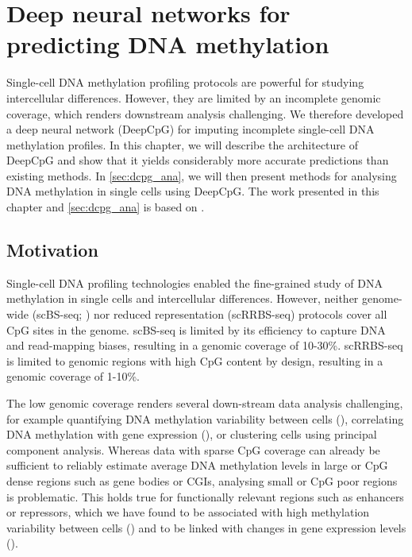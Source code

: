 \chapter{Deep neural networks for predicting DNA methylation} \label{sec:dcpg}

\ifpdf
    \graphicspath{{Chapter4/Figs/Raster/}{Chapter4/Figs/PDF/}{Chapter4/Figs/}}
\else
    \graphicspath{{Chapter4/Figs/Vector/}{Chapter4/Figs/}}
\fi

Single-cell DNA methylation profiling protocols are powerful for studying intercellular differences. However, they are limited by an incomplete genomic coverage, which renders downstream analysis challenging. We therefore developed a deep neural network (DeepCpG) for imputing incomplete single-cell DNA methylation profiles. In this chapter, we will describe the architecture of DeepCpG and show that it yields considerably more accurate predictions than existing methods. In \cref{sec:dcpg_ana}, we will then present methods for analysing DNA methylation in single cells using DeepCpG. The work presented in this chapter and \cref{sec:dcpg_ana} is based on \citet{angermueller_accurate_2017}.


\section{Motivation}

Single-cell DNA profiling technologies enabled the fine-grained study of DNA methylation in single cells and intercellular differences. However, neither genome-wide (scBS-seq; ) nor reduced representation (scRRBS-seq) protocols cover all CpG sites in the genome. scBS-seq is limited by its efficiency to capture DNA and read-mapping biases, resulting in a genomic coverage of 10-30\%. scRRBS-seq is limited to genomic regions with high CpG content by design, resulting in a genomic coverage of 1-10\%.

The low genomic coverage renders several down-stream data analysis challenging, for example quantifying DNA methylation variability between cells (), correlating DNA methylation with gene expression (), or clustering cells using principal component analysis. Whereas data with sparse CpG coverage can already be sufficient to reliably estimate average DNA methylation levels in large or CpG dense regions such as gene bodies or CGIs, analysing small or CpG poor regions is problematic. This holds true for functionally relevant regions such as enhancers or repressors, which we have found to be associated with high methylation variability between cells () and to be linked with changes in gene expression levels ().

